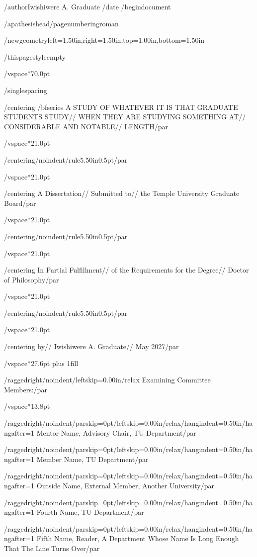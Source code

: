 /author{Iwishiwere A. Graduate}
/date{}
/begin{document}


/apathesishead/pagenumbering{roman}

/newgeometry{left=1.50in,right=1.50in,top=1.00in,bottom=1.50in}

/thispagestyle{empty}

/vspace*{70.0pt}

/singlespacing

{/centering
/bfseries A STUDY OF WHATEVER IT IS THAT GRADUATE STUDENTS STUDY//
WHEN THEY ARE STUDYING SOMETHING AT//
CONSIDERABLE AND NOTABLE//
LENGTH/par}

/vspace*{21.0pt}

{/centering/noindent/rule{5.50in}{0.5pt}/par}

/vspace*{21.0pt}

{/centering
A Dissertation//
Submitted to//
the Temple University Graduate Board/par}

/vspace*{21.0pt}

{/centering/noindent/rule{5.50in}{0.5pt}/par}

/vspace*{21.0pt}

{/centering
In Partial Fulfillment//
of the Requirements for the Degree//
Doctor of Philosophy/par}

/vspace*{21.0pt}

{/centering/noindent/rule{5.50in}{0.5pt}/par}

/vspace*{21.0pt}

{/centering
by//
Iwishiwere A. Graduate//
May 2027/par}

/vspace*{27.6pt plus 1fill}

{/raggedright/noindent/leftskip=0.00in/relax
Examining Committee Members:/par}

/vspace*{13.8pt}

{/raggedright/noindent/parskip=0pt/leftskip=0.00in/relax/hangindent=0.50in/hangafter=1
Mentor Name, Advisory Chair, TU Department/par}

{/raggedright/noindent/parskip=0pt/leftskip=0.00in/relax/hangindent=0.50in/hangafter=1
Member Name, TU Department/par}

{/raggedright/noindent/parskip=0pt/leftskip=0.00in/relax/hangindent=0.50in/hangafter=1
Outside Name, External Member, Another University/par}

{/raggedright/noindent/parskip=0pt/leftskip=0.00in/relax/hangindent=0.50in/hangafter=1
Fourth Name, TU Department/par}

{/raggedright/noindent/parskip=0pt/leftskip=0.00in/relax/hangindent=0.50in/hangafter=1
Fifth Name, Reader,
A Department Whose Name Is Long Enough That The Line Turns Over/par}

